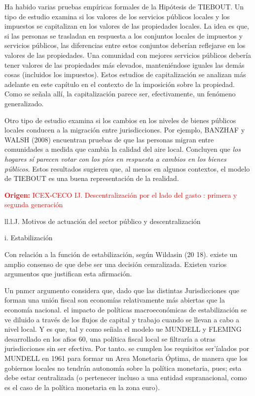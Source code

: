 \documentclass[10pt,a4paper]{article}
\begin{document}
Ha habido varias pruebas empíricas formales de la Hipótesis de TIEBOUT. Un tipo de estudio examina si los valores de los servicios públicos locales y los impuestos se capitalizan en los valores de las propiedades locales. La idea es que, si las personas se trasladan en respuesta a los conjuntos locales de impuestos y servicios públicos, las diferencias entre estos conjuntos deberían reflejarse en los valores de las propiedades. Una comunidad con mejores servicios públicos debería tener valores de las propiedades más elevados, manteniéndose iguales las demás cosas (incluidos los impuestos). Estos estudios de capitalización se analizan más adelante en este capítulo en el contexto de la imposición sobre la propiedad. Como se señala allí, la capitalización parece ser, efectivamente, un fenómeno generalizado.

Otro tipo de estudio examina si los cambios en los niveles de bienes públicos locales conducen a la migración entre jurisdicciones. Por ejemplo, BANZHAF y WALSH (2008) encuentran pruebas de que las personas migran entre comunidades a medida que cambia la calidad del aire local. Concluyen que \textit{los hogares sí parecen votar con los pies en respuesta a cambios en los bienes públicos}. Estos resultados sugieren que, al menos en algunos contextos, el modelo de TIEBOUT es una buena representación de la realidad.


\textcolor{red}{\textbf{Origen:} ICEX-CECO}
\textcolor{red}{IJ. Descentralización por el lado del gasto : primera y segunda generación}



ll.l.J. Motivos de actuación del sector público y descentralización

i. Estabilización

Con relación a la función de estabilización, según Wildasin (20 18). existe un amplio consenso de que debe ser una decisión cemralizada. Existen varios argumentos que justifican esta afirmación.

Un pnmcr argumento considera que, dado que las distintas Jurisdicciones que forman una unión fiscal son economías relativamente más abiertas que la economía nacional. el impacto de políticas macroeconómicas de estabilización se ve diluido a través de los flujos de capital y trabajo cuando se llevan a cabo a nivel local. Y es que, tal y como seíiala el modelo ue MUNDELL y FLEMING desarrollado en los afios 60, una política fiscal local se filtraría a otras jurisdicciones sin ser efectiva. Por tanto. se cumplen los requisitos ser'íalados por MUNDELL en 1961 para formar un Area Monetaria Óptima, de manera que los gobiernos locales no tendrán autonomía sobre la política monetaria, pues; esta debe estar centralizada (o pertenecer incluso a una entidad supranacional, como es el caso de la política monetaria en la zona euro).
\end{document}
